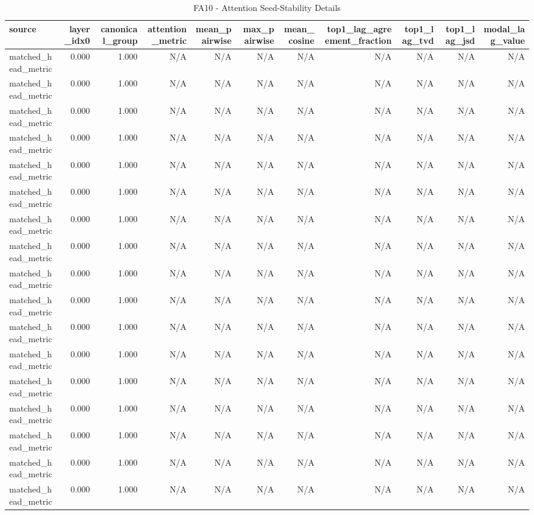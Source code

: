 \begin{table}[h!]
\centering
\caption{FA10 - Attention Seed-Stability Details}
\label{tab:fa10\_-\_attention\_seed-stability\_details}
\begin{tabular}{lrrrrrrrrrr}
\toprule
source & layer\_idx0 & canonical\_group & attention\_metric & mean\_pairwise & max\_pairwise & mean\_cosine & top1\_lag\_agreement\_fraction & top1\_lag\_tvd & top1\_lag\_jsd & modal\_lag\_value \\
\midrule
matched\_head\_metric & 0.000 & 1.000 & N/A & N/A & N/A & N/A & N/A & N/A & N/A & N/A \\
matched\_head\_metric & 0.000 & 1.000 & N/A & N/A & N/A & N/A & N/A & N/A & N/A & N/A \\
matched\_head\_metric & 0.000 & 1.000 & N/A & N/A & N/A & N/A & N/A & N/A & N/A & N/A \\
matched\_head\_metric & 0.000 & 1.000 & N/A & N/A & N/A & N/A & N/A & N/A & N/A & N/A \\
matched\_head\_metric & 0.000 & 1.000 & N/A & N/A & N/A & N/A & N/A & N/A & N/A & N/A \\
matched\_head\_metric & 0.000 & 1.000 & N/A & N/A & N/A & N/A & N/A & N/A & N/A & N/A \\
matched\_head\_metric & 0.000 & 1.000 & N/A & N/A & N/A & N/A & N/A & N/A & N/A & N/A \\
matched\_head\_metric & 0.000 & 1.000 & N/A & N/A & N/A & N/A & N/A & N/A & N/A & N/A \\
matched\_head\_metric & 0.000 & 1.000 & N/A & N/A & N/A & N/A & N/A & N/A & N/A & N/A \\
matched\_head\_metric & 0.000 & 1.000 & N/A & N/A & N/A & N/A & N/A & N/A & N/A & N/A \\
matched\_head\_metric & 0.000 & 1.000 & N/A & N/A & N/A & N/A & N/A & N/A & N/A & N/A \\
matched\_head\_metric & 0.000 & 1.000 & N/A & N/A & N/A & N/A & N/A & N/A & N/A & N/A \\
matched\_head\_metric & 0.000 & 1.000 & N/A & N/A & N/A & N/A & N/A & N/A & N/A & N/A \\
matched\_head\_metric & 0.000 & 1.000 & N/A & N/A & N/A & N/A & N/A & N/A & N/A & N/A \\
matched\_head\_metric & 0.000 & 1.000 & N/A & N/A & N/A & N/A & N/A & N/A & N/A & N/A \\
matched\_head\_metric & 0.000 & 1.000 & N/A & N/A & N/A & N/A & N/A & N/A & N/A & N/A \\
matched\_head\_metric & 0.000 & 1.000 & N/A & N/A & N/A & N/A & N/A & N/A & N/A & N/A \\

\end{tabular}
\end{table}
